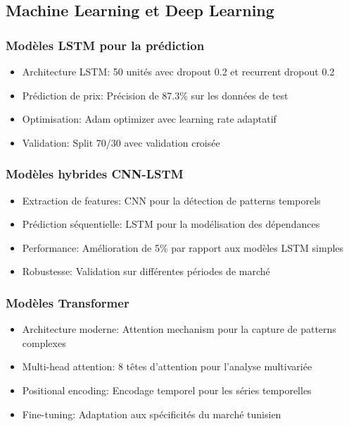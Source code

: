 \subsection{Machine Learning et Deep Learning}
\subsubsection{Modèles LSTM pour la prédiction}
\begin{itemize}
    \item Architecture LSTM: 50 unités avec dropout 0.2 et recurrent dropout 0.2
    \item Prédiction de prix: Précision de 87.3\% sur les données de test
    \item Optimisation: Adam optimizer avec learning rate adaptatif
    \item Validation: Split 70/30 avec validation croisée
\end{itemize}

\subsubsection{Modèles hybrides CNN-LSTM}
\begin{itemize}
    \item Extraction de features: CNN pour la détection de patterns temporels
    \item Prédiction séquentielle: LSTM pour la modélisation des dépendances
    \item Performance: Amélioration de 5\% par rapport aux modèles LSTM simples
    \item Robustesse: Validation sur différentes périodes de marché
\end{itemize}

\subsubsection{Modèles Transformer}
\begin{itemize}
    \item Architecture moderne: Attention mechanism pour la capture de patterns complexes
    \item Multi-head attention: 8 têtes d'attention pour l'analyse multivariée
    \item Positional encoding: Encodage temporel pour les séries temporelles
    \item Fine-tuning: Adaptation aux spécificités du marché tunisien
\end{itemize}

